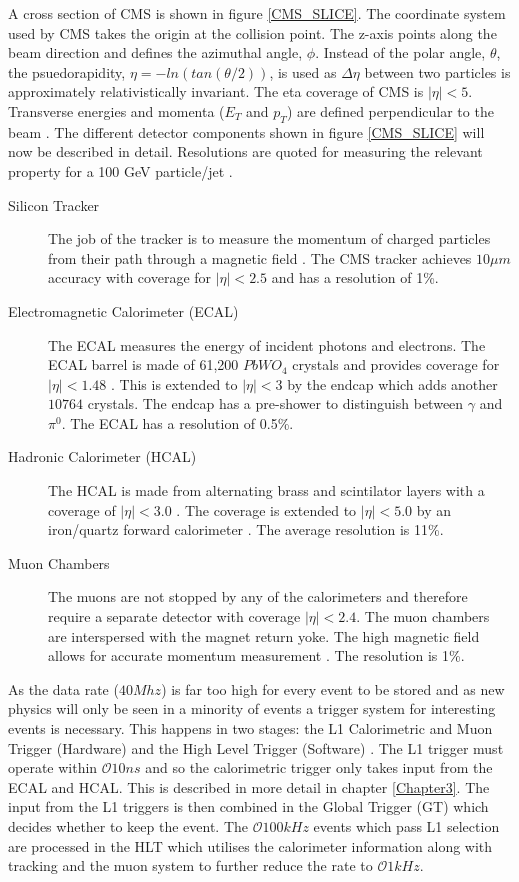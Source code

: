 A cross section of CMS is shown in figure \ref{CMS_SLICE}. The coordinate system used by CMS takes the origin at 
the collision point. The z-axis points along the beam direction and defines the azimuthal angle, $\phi$. 
Instead of the polar angle, $\theta$, the psuedorapidity, $\eta=-ln(tan(\theta/2))$, is used as $\Delta \eta$
between two particles is approximately relativistically invariant. The eta coverage of CMS is $|\eta|<5$. 
Transverse energies and momenta ($E_T $ and $p_T$)  are defined perpendicular to the beam \cite{cmsiop}. 
The different detector components shown in figure \ref{CMS_SLICE} will now be described in detail. 
Resolutions are quoted for measuring the relevant property for a 100 GeV particle/jet \cite{SACharacteristics}.
\begin{description}
\item[Silicon Tracker]The job of the tracker is to measure the momentum of charged particles from their path through a magnetic field \cite{siliconTDR}. The CMS tracker achieves $10\mu m$ accuracy with coverage for $|\eta|<2.5$ and has a resolution of 1\%.
\item[Electromagnetic Calorimeter (ECAL)] The ECAL measures the energy of incident photons and electrons. The ECAL barrel is made of 61,200 $PbWO_4$ crystals and provides coverage for $|\eta|<1.48$ \cite{ecal}. This is extended to $|\eta|<3$ by the endcap which adds another $10764$ crystals. The endcap has a pre-shower to distinguish between $\gamma$ and $\pi^0$. The ECAL has a resolution of 0.5\%.
 \item[Hadronic Calorimeter (HCAL)] The HCAL is made from alternating brass and scintilator layers with a coverage of $|\eta|<3.0$ \cite{hcal}. The coverage is extended to  $|\eta|<5.0$ by an iron/quartz forward calorimeter \cite{hfhcal}. The average resolution is 11\%. 
 \item[Muon Chambers]The muons are not stopped by any of the calorimeters and therefore require a separate detector with coverage $|\eta| < 2.4$. The muon chambers are interspersed with the magnet return yoke. The high magnetic field allows for accurate momentum measurement \cite{muons}. The resolution is 1\%.
\end{description}
As the data rate ($40Mhz$) is far too high for every event to be stored and as new physics will only 
be seen in a minority of events a trigger system for interesting events is necessary. 
This happens in two stages: the L1 Calorimetric and Muon Trigger (Hardware) and the High Level Trigger (Software) \cite{HLT}. 
The L1 trigger must operate within $\mathcal{O}10ns$ and so  the calorimetric trigger only takes input
from the ECAL and HCAL. This is described in more detail in chapter \ref{Chapter3}. The input from the
L1 triggers is then combined in the Global Trigger (GT) which decides whether to keep the event. 
The $\mathcal{O}100kHz$ events which pass L1 selection are processed in the HLT which utilises the 
calorimeter information along with tracking and the muon system to further reduce the rate to $\mathcal{O}1kHz$.
